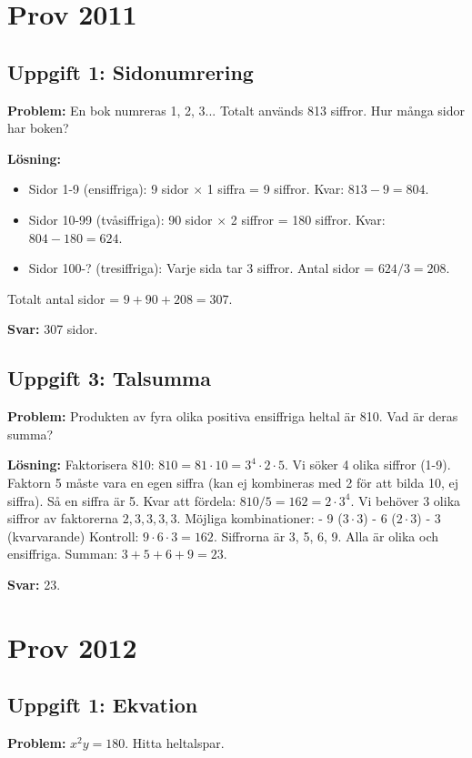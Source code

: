 \documentclass[11pt, a4paper]{article}
\begin{document}
\section{Prov 2011}
\subsection{Uppgift 1: Sidonumrering}
\textbf{Problem:} En bok numreras 1, 2, 3... Totalt används 813 siffror. Hur många sidor har boken?

\textbf{Lösning:}
\begin{itemize}
    \item Sidor 1-9 (ensiffriga): 9 sidor $\times$ 1 siffra = 9 siffror. Kvar: $813 - 9 = 804$.
    \item Sidor 10-99 (tvåsiffriga): 90 sidor $\times$ 2 siffror = 180 siffror. Kvar: $804 - 180 = 624$.
    \item Sidor 100-? (tresiffriga): Varje sida tar 3 siffror. Antal sidor = $624 / 3 = 208$.
\end{itemize}
Totalt antal sidor = $9 + 90 + 208 = 307$.

\textbf{Svar:} 307 sidor.

\subsection{Uppgift 3: Talsumma}
\textbf{Problem:} Produkten av fyra olika positiva ensiffriga heltal är 810. Vad är deras summa?

\textbf{Lösning:}
Faktorisera 810: $810 = 81 \cdot 10 = 3^4 \cdot 2 \cdot 5$.
Vi söker 4 olika siffror (1-9).
Faktorn 5 måste vara en egen siffra (kan ej kombineras med 2 för att bilda 10, ej siffra). Så en siffra är 5.
Kvar att fördela: $810/5 = 162 = 2 \cdot 3^4$.
Vi behöver 3 olika siffror av faktorerna $2, 3, 3, 3, 3$.
Möjliga kombinationer:
- 9 ($3\cdot3$)
- 6 ($2\cdot3$)
- 3 (kvarvarande)
Kontroll: $9 \cdot 6 \cdot 3 = 162$. Siffrorna är 3, 5, 6, 9. Alla är olika och ensiffriga.
Summan: $3 + 5 + 6 + 9 = 23$.

\textbf{Svar:} 23.

\newpage

\section{Prov 2012}
\subsection{Uppgift 1: Ekvation}
\textbf{Problem:} $x^2 y = 180$. Hitta heltalspar.
\end{document}
